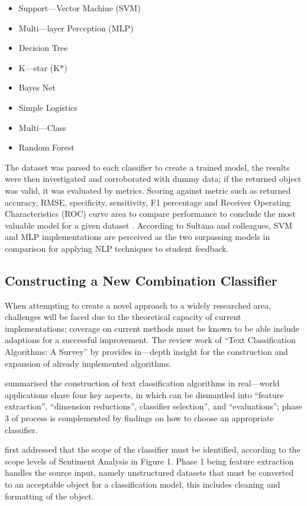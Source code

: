 \begin{itemize}
    \item Support---Vector Machine (SVM)
    \item Multi---layer Perception (MLP)
    \item Decision Tree
    \item K---star (K*)
    \item Bayes Net
    \item Simple Logistics
    \item Multi---Class
    \item Random Forest
\end{itemize}

The dataset was parsed to each classifier to create a trained model, the results were then investigated and corroborated with dummy data; if the returned object was valid, it was evaluated by metrics. Scoring against metric such as returned accuracy, RMSE, specificity, sensitivity, F1 percentage and Receiver Operating Characteristics (ROC) curve area to compare performance to conclude the most valuable model for a given dataset \parencite{sultana2018prediction}. According to Sultana and colleagues, SVM and MLP implementations are perceived as the two surpassing models in comparison for applying NLP techniques to student feedback.

\subsection{Constructing a New Combination Classifier}

When attempting to create a novel approach to a widely researched area, challenges will be faced due to the theoretical capacity of current implementations; coverage on current methods must be known to be able include adaptions for a successful improvement. The review work of “Text Classification Algorithms: A Survey” by \parencite{kowsari2019text} provides in---depth insight for the construction and expansion of already implemented algorithms.

\textcite{kowsari2019text} summarised the construction of text classification algorithms in real---world applications share four key aspects, in which can be dismantled into “feature extraction”, “dimension reductions”, classifier selection”, and “evaluations”; phase 3 of \textcite{kowsari2019text} process is complemented by \textcite{enriquez2013comparative} findings on how to choose an appropriate classifier.

\textcite{kowsari2019text} first addressed that the scope of the classifier must be identified, according to the scope levels of Sentiment Analysis in Figure 1. Phase 1 being feature extraction handles the source input, namely unstructured datasets that must be converted to an acceptable object for a classification model, this includes cleaning and formatting of the object.

